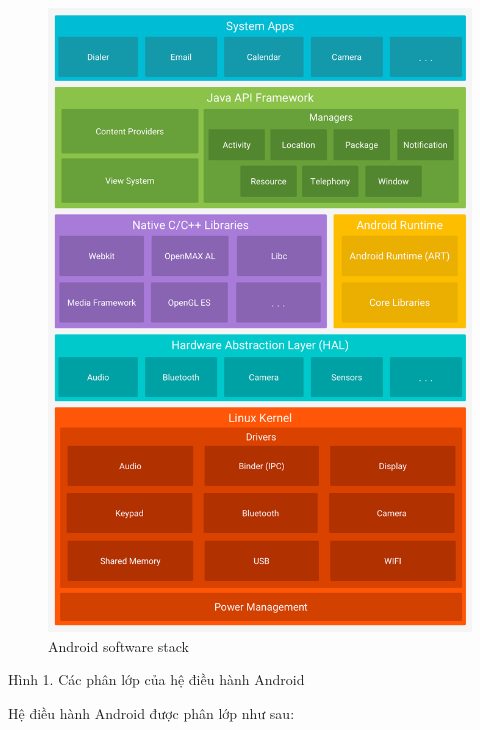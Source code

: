 \begin{figure}
  \centering
  \includegraphics{../images/android-stack_2x.png}
  \caption{Android software stack}
\end{figure}

Hình 1. Các phân lớp của hệ điều hành Android

Hệ điều hành Android được phân lớp như sau:

